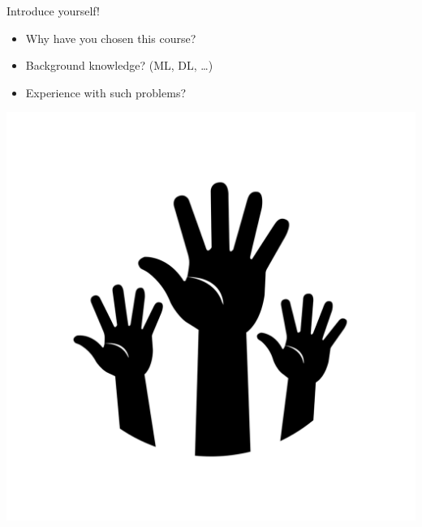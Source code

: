 \begin{frame}[c]{Introduce yourself!}

\begin{itemize}
  \item Why have you chosen this course?
  \medskip
  \item Background knowledge? (ML, DL, \ldots)
  \medskip 
  \item Experience with such problems?
\end{itemize}

\bigskip
\centering
\includegraphics[scale=0.1]{images/hands.png}

\end{frame}
% 
